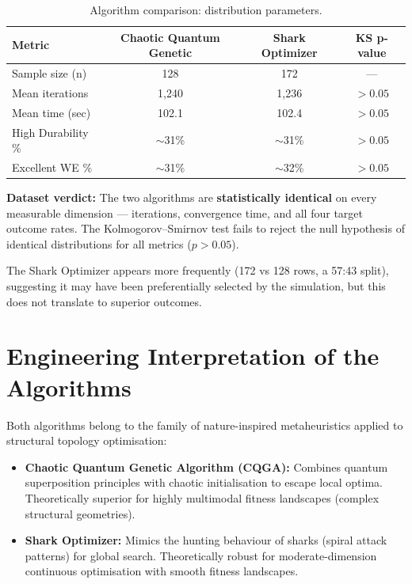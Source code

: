 \documentclass[11pt, a4paper]{report}
\begin{document}
\begin{table}[H]
\centering
\caption{Algorithm comparison: distribution parameters.}
\label{tab:algo_compare}
\begin{tabular}{lccc}
\toprule
\textbf{Metric} & \textbf{Chaotic Quantum Genetic} & \textbf{Shark Optimizer} & \textbf{KS p-value} \\
\midrule
Sample size (n)        & 128        & 172        & --- \\
Mean iterations        & 1{,}240    & 1{,}236    & $>0.05$ \\
Mean time (sec)        & 102.1      & 102.4      & $>0.05$ \\
High Durability \%     & $\sim$31\% & $\sim$31\% & $>0.05$ \\
Excellent WE \%        & $\sim$31\% & $\sim$32\% & $>0.05$ \\
\bottomrule
\end{tabular}
\end{table}

\begin{decisionbox}
\textbf{Dataset verdict:} The two algorithms are \textbf{statistically identical} on every measurable dimension --- iterations, convergence time, and all four target outcome rates. The Kolmogorov--Smirnov test fails to reject the null hypothesis of identical distributions for all metrics ($p > 0.05$).

The Shark Optimizer appears more frequently (172 vs 128 rows, a 57:43 split), suggesting it may have been preferentially selected by the simulation, but this does not translate to superior outcomes.
\end{decisionbox}

\section{Engineering Interpretation of the Algorithms}

Both algorithms belong to the family of nature-inspired metaheuristics applied to structural topology optimisation:

\begin{itemize}[nosep]
\item \textbf{Chaotic Quantum Genetic Algorithm (CQGA):} Combines quantum superposition principles with chaotic initialisation to escape local optima. Theoretically superior for highly multimodal fitness landscapes (complex structural geometries).

\item \textbf{Shark Optimizer:} Mimics the hunting behaviour of sharks (spiral attack patterns) for global search. Theoretically robust for moderate-dimension continuous optimisation with smooth fitness landscapes.
\end{itemize}
\end{document}
